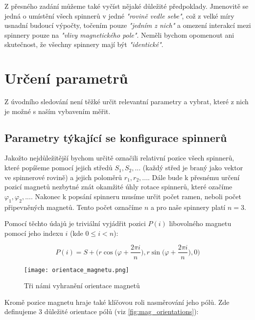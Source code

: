 \documentclass[12pt, a4paper,
 twoside,        %
 openright
]{report}
\begin{document}
Z přesného zadání můžeme také vyčíst nějaké důležité předpoklady.
Jmenovitě se jedná o
umístění všech spinnerů v jedné \textit{"rovině vedle sebe"}, což z velké míry usnadní budoucí výpočty,
točením pouze \textit{"jedním z nich"} a
omezení interakcí mezi spinnery pouze na \textit{"vlivy magnetického pole"}.
Neměli bychom opomenout ani skutečnost, že všechny spinnery mají být \textit{"identické"}.

\section{Určení parametrů}

Z úvodního sledování není těžké určit relevantní parametry a vybrat, které z nich je možné s naším vybavením měřit.

\subsection{Parametry týkající se konfigurace spinnerů}
\label{sub:param_konf}
Jakožto nejdůležitější bychom určitě označili relativní pozice všech spinnerů, které popíšeme pomocí jejich středů $S_1, S_2,...$ (každý střed je braný jako vektor ve spinnerové rovině) a jejich poloměrů $r_1, r_2, ...$.
Dále bude k přesnému určení pozicí magnetů nezbytné znát okamžité úhly rotace spinnerů, které ozačíme $\varphi_1, \varphi_2,...$.
Nakonec k popsání spinneru musíme určit počet ramen, neboli počet připevněných magnetů. Tento počet označíme $n$ a pro naše spinnery platí $n=3$.

Pomocí těchto údajů je triviální vyjádřit pozici $P(i)$ libovolného magnetu pomocí jeho indexu $i$ (kde $0 \leq i < n$):

\begin{equation}
    \label{eq:magnet_pos}
    P(i) = S + \biggr(r\cos{\bigg(\varphi + \frac{2\pi i}{n}\bigg)},
    r\sin{\bigg(\varphi+\frac{2\pi i}{n}}\bigg), 0 \bigg)
\end{equation}

\begin{wrapfigure}{r}{0.4\textwidth}
    \vspace*{-0.5cm}
    \texttt{[image: orientace\_magnetu.png]}
    \centering
    \caption{Tři námi vyhranění orientace magnetů}
    \label{fig:mag_orientations}
\end{wrapfigure}

Kromě pozice magnetu hraje také klíčovou roli nasměrování jeho pólů. Zde definujeme 3 důležité orientace pólů (viz \autoref{fig:mag_orientations}):
\end{document}
